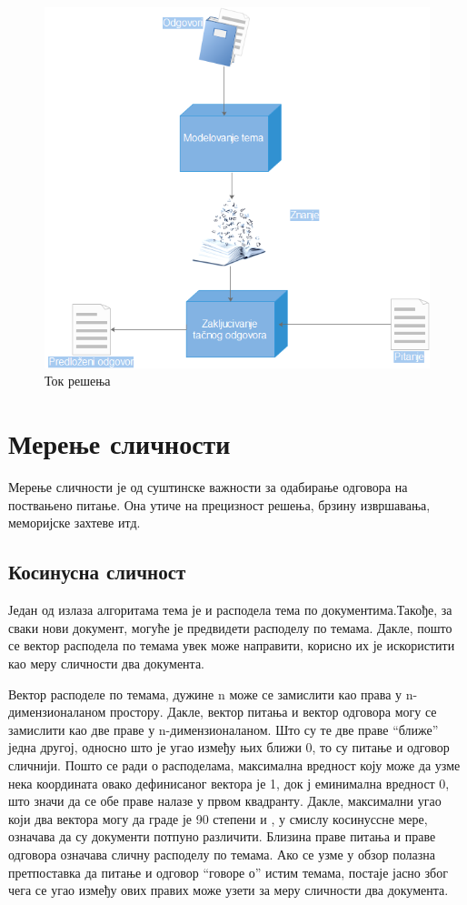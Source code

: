 \begin{figure}[H]
    \centering
   \includegraphics[scale=0.9]{./Slike/slika37.png} 
	\caption{Ток решења}
	\label{fig:slika1}
\end{figure}


\section{Мерење сличности}

Мерење сличности је од суштинске важности за одабирање одговора на поствањено питање. Она утиче на прецизност решења, брзину извршавања, меморијске захтеве итд. 



\subsection{Косинусна сличност}

Један од излаза алгоритама тема је и расподела тема по документима.Такође, за сваки нови документ, могуће је предвидети расподелу по темама. Дакле, пошто се вектор расподела по темама увек може направити, корисно их је искористити као меру сличности два документа.

Вектор расподеле по темама, дужине n може се замислити  као права у n-димензионаланом простору. Дакле, вектор питања и вектор одговора могу се замислити као две праве у n-димензионаланом. Што су те две праве "`ближе"' једна другој, односно што је угао између њих ближи 0, то су питање и одговор сличнији. 
Пошто се ради о расподелама, максимална вредност коју може да узме нека координата овако дефинисаног вектора је 1, док ј еминимална вредност 0, што значи да се обе праве налазе у првом квадранту. Дакле, максимални угао који два вектора могу да граде је 90 степени и , у смислу косинуссне мере, означава да су документи потпуно различити.
Близина праве питања и праве одговора означава сличну расподелу по темама. Ако се узме у обзор полазна претпоставка да питање и одговор "`говоре о"' истим темама, постаје јасно због чега се угао између ових правих може узети за меру сличности два документа.

